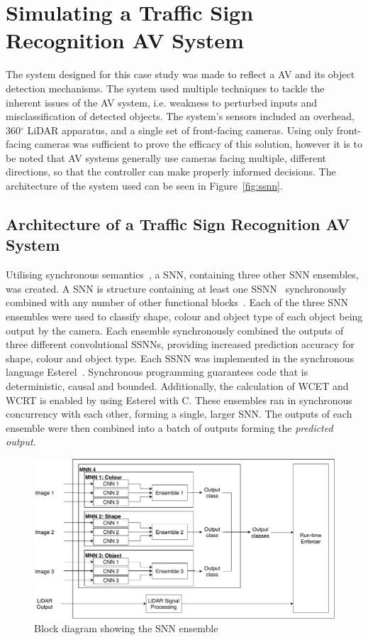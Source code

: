 \section{Simulating a Traffic Sign Recognition AV System}
The system designed for this case study was made to reflect a \acf{AV} and its object detection mechanisms. 
The system used multiple techniques to tackle the inherent issues of the \ac{AV} system, i.e. weakness to perturbed inputs and misclassification of detected objects.
The system's sensors included an overhead, 360$^\circ$ \acf{LiDAR} apparatus, and a single set of front-facing cameras.
Using only front-facing cameras was sufficient to prove the efficacy of this solution, however it is to be noted that \ac{AV} systems generally use cameras facing multiple, different directions, so that the controller can make properly informed decisions.
The architecture of the system used can be seen in Figure~\ref{fig:ssnn}. 

\subsection{Architecture of a Traffic Sign Recognition AV System}
Utilising synchronous semantics~\cite{benveniste2003synchronous}, a \acf{SNN}, containing three other \ac{SNN} ensembles, was created.
A \ac{SNN} is structure containing at least one \acf{SSNN}~\cite{sann} synchronously combined with any number of other functional blocks~\cite{sann}.
Each of the three \ac{SNN} ensembles were used to classify shape, colour and object type of each object being output by the camera.
Each ensemble synchronously combined the outputs of three different convolutional \acp{SSNN}, providing increased prediction accuracy for shape, colour and object type. 
Each \ac{SSNN} was implemented in the synchronous language Esterel~\cite{Esterel}.
Synchronous programming guarantees code that is deterministic, causal and bounded.
Additionally, the calculation of \acf{WCET} and \acf{WCRT} is enabled by using Esterel with C.
These ensembles ran in synchronous concurrency with each other, forming a single, larger \ac{SNN}. 
The outputs of each ensemble were then combined into a batch of outputs forming the \textit{predicted output}.

\begin{figure}[h]
	\centering
	\includegraphics[width=\textwidth]{Content/fig/MNN.pdf}
	\caption{Block diagram showing the \acf{SNN} ensemble} \label{fig:mnn}
\end{figure}


